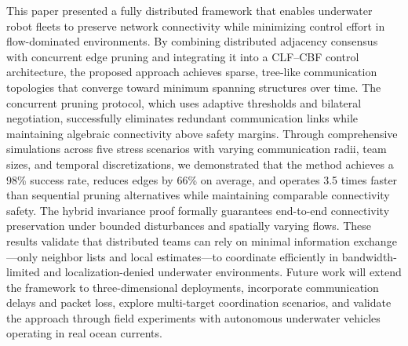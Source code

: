 \documentclass[conference]{IEEEconf}
\theoremstyle{plain}
\begin{document}
This paper presented a fully distributed framework that enables underwater robot fleets to preserve network connectivity while minimizing control effort in flow-dominated environments. By combining distributed adjacency consensus with concurrent edge pruning and integrating it into a CLF--CBF control architecture, the proposed approach achieves sparse, tree-like communication topologies that converge toward minimum spanning structures over time. The concurrent pruning protocol, which uses adaptive thresholds and bilateral negotiation, successfully eliminates redundant communication links while maintaining algebraic connectivity above safety margins. Through comprehensive simulations across five stress scenarios with varying communication radii, team sizes, and temporal discretizations, we demonstrated that the method achieves a 98\% success rate, reduces edges by 66\% on average, and operates 3.5 times faster than sequential pruning alternatives while maintaining comparable connectivity safety. The hybrid invariance proof formally guarantees end-to-end connectivity preservation under bounded disturbances and spatially varying flows. These results validate that distributed teams can rely on minimal information exchange—only neighbor lists and local estimates—to coordinate efficiently in bandwidth-limited and localization-denied underwater environments. Future work will extend the framework to three-dimensional deployments, incorporate communication delays and packet loss, explore multi-target coordination scenarios, and validate the approach through field experiments with autonomous underwater vehicles operating in real ocean currents.



\end{document}
